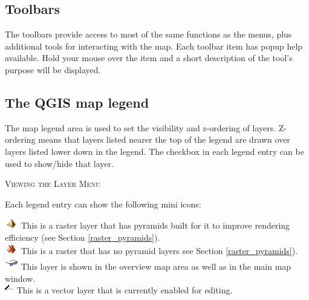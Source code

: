 \subsection{Toolbars}
The toolbars provide access to most of the same functions as the menus, plus
additional tools for interacting with the map. Each toolbar item has popup
help available. Hold your mouse over the item and a short description of the
tool's purpose will be displayed. %

\subsection{The QGIS map legend}
The map legend area is used to set the visibility and z-ordering of layers.
Z-ordering means that layers listed nearer the top of the legend are drawn
over layers listed lower down in the legend. The checkbox in each legend entry
can be used to show/hide that layer.
\begin{Tip} \caption{\textsc{Viewing the Layer Menu}}
\end{Tip}

Each legend entry can show the following mini icons:

\includegraphics[scale=1]{qgis_user_guide_images/pyramid.png} This is a raster layer that has pyramids built for it to improve rendering efficiency (see Section \ref{raster_pyramids}).\\
\includegraphics[scale=1]{qgis_user_guide_images/no_pyramid.png} This is a raster that has no pyramid layers see Section \ref{raster_pyramids}).\\
\includegraphics[scale=1]{qgis_user_guide_images/inoverview.png} This layer is shown in the overview map area as well as in the main map window.\\
\includegraphics[scale=1]{qgis_user_guide_images/editable.png} This is a vector layer that is currently enabled for editing.\\
